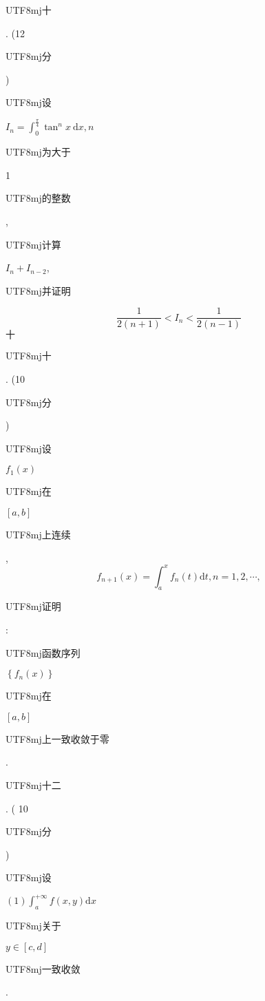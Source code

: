 \documentclass[10pt]{article}
\begin{document}
\begin{CJK}{UTF8}{mj}十\end{CJK}. (12 \begin{CJK}{UTF8}{mj}分\end{CJK}) \begin{CJK}{UTF8}{mj}设\end{CJK} $I_{n}=\int_{0}^{\frac{\pi}{4}} \tan ^{n} x \mathrm{~d} x, n$ \begin{CJK}{UTF8}{mj}为大于\end{CJK} 1 \begin{CJK}{UTF8}{mj}的整数\end{CJK}, \begin{CJK}{UTF8}{mj}计算\end{CJK} $I_{n}+I_{n-2}$, \begin{CJK}{UTF8}{mj}并证明\end{CJK}
$$
\frac{1}{2(n+1)}<I_{n}<\frac{1}{2(n-1)}
$$
$十$ \begin{CJK}{UTF8}{mj}十\end{CJK}. (10 \begin{CJK}{UTF8}{mj}分\end{CJK}) \begin{CJK}{UTF8}{mj}设\end{CJK} $f_{1}(x)$ \begin{CJK}{UTF8}{mj}在\end{CJK} $[a, b]$ \begin{CJK}{UTF8}{mj}上连续\end{CJK},
$$
f_{n+1}(x)=\int_{a}^{x} f_{n}(t) \mathrm{d} t, n=1,2, \cdots,
$$
\begin{CJK}{UTF8}{mj}证明\end{CJK}: \begin{CJK}{UTF8}{mj}函数序列\end{CJK} $\left\{f_{n}(x)\right\}$ \begin{CJK}{UTF8}{mj}在\end{CJK} $[a, b]$ \begin{CJK}{UTF8}{mj}上一致收敛于零\end{CJK}.

\begin{CJK}{UTF8}{mj}十二\end{CJK}. ( 10 \begin{CJK}{UTF8}{mj}分\end{CJK}) \begin{CJK}{UTF8}{mj}设\end{CJK} $(1) \int_{a}^{+\infty} f(x, y) \mathrm{d} x$ \begin{CJK}{UTF8}{mj}关于\end{CJK} $y \in[c, d]$ \begin{CJK}{UTF8}{mj}一致收敛\end{CJK}.
\end{document}
